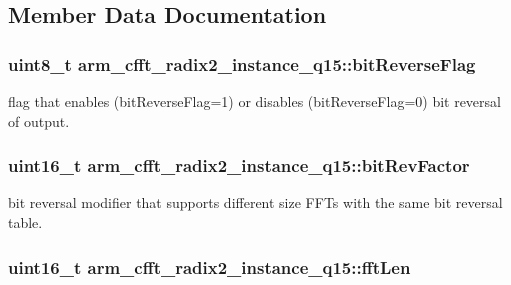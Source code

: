 \subsection{Member Data Documentation}
\hypertarget{structarm__cfft__radix2__instance__q15_af8300c1f60caa21e6b44b9240ab5af19}{
\subsubsection[{bit\-Reverse\-Flag}]{\setlength{\rightskip}{0pt plus 5cm}uint8\-\_\-t arm\-\_\-cfft\-\_\-radix2\-\_\-instance\-\_\-q15\-::bit\-Reverse\-Flag}}\label{structarm__cfft__radix2__instance__q15_af8300c1f60caa21e6b44b9240ab5af19}
flag that enables (bit\-Reverse\-Flag=1) or disables (bit\-Reverse\-Flag=0) bit reversal of output. \hypertarget{structarm__cfft__radix2__instance__q15_a8722720c542cabd41df83fe88ef4f4cb}{
\subsubsection[{bit\-Rev\-Factor}]{\setlength{\rightskip}{0pt plus 5cm}uint16\-\_\-t arm\-\_\-cfft\-\_\-radix2\-\_\-instance\-\_\-q15\-::bit\-Rev\-Factor}}\label{structarm__cfft__radix2__instance__q15_a8722720c542cabd41df83fe88ef4f4cb}
bit reversal modifier that supports different size F\-F\-Ts with the same bit reversal table. \hypertarget{structarm__cfft__radix2__instance__q15_a874085647351dcf3f0de39d2b1d49744}{
\subsubsection[{fft\-Len}]{\setlength{\rightskip}{0pt plus 5cm}uint16\-\_\-t arm\-\_\-cfft\-\_\-radix2\-\_\-instance\-\_\-q15\-::fft\-Len}}\label{structarm__cfft__radix2__instance__q15_a874085647351dcf3f0de39d2b1d49744}
